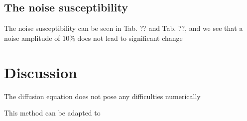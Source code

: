 \documentclass[11pt,a4paper]{article}
\begin{document}
\subsection{The noise susceptibility}

The noise susceptibility can be seen in Tab. ?? and Tab. ??, and we see that a noise amplitude of $10 \%$ does not lead to significant change 




\section{Discussion}



The diffusion equation does not pose any difficulties numerically 


This method can be adapted to 


\newpage 
{}
\end{document}
